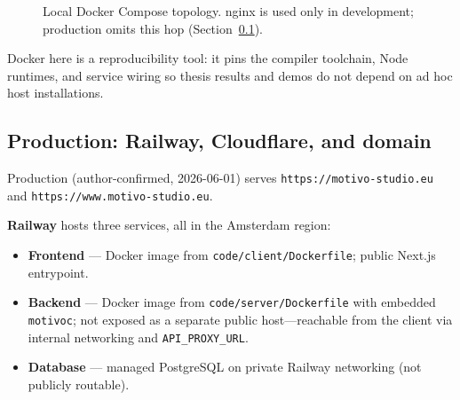 \begin{figure}[htbp]
  \centering
  \caption{Local Docker Compose topology.
  nginx is used only in development; production omits this hop (Section~\ref{subsec:production-railway}).}%
  \label{fig:deployment-local}
\end{figure}

Docker here is a reproducibility tool: it pins the compiler toolchain, Node runtimes, and service wiring so thesis
results and demos do not depend on ad hoc host installations.

\subsection{Production: Railway, Cloudflare, and domain}\label{subsec:production-railway}

Production (author-confirmed, 2026-06-01) serves \texttt{https://motivo-studio.eu} and
\texttt{https://www.motivo-studio.eu}.

\textbf{Railway} hosts three services, all in the Amsterdam region:

\begin{itemize}
  \item \textbf{Frontend} --- Docker image from \texttt{code/client/Dockerfile}; public Next.js entrypoint.
  \item \textbf{Backend} --- Docker image from \texttt{code/server/Dockerfile} with embedded
    \texttt{motivoc}; not exposed
    as a separate public host---reachable from the client via internal networking and \texttt{API\_PROXY\_URL}.
  \item \textbf{Database} --- managed PostgreSQL on private Railway networking (not publicly routable).
\end{itemize}

